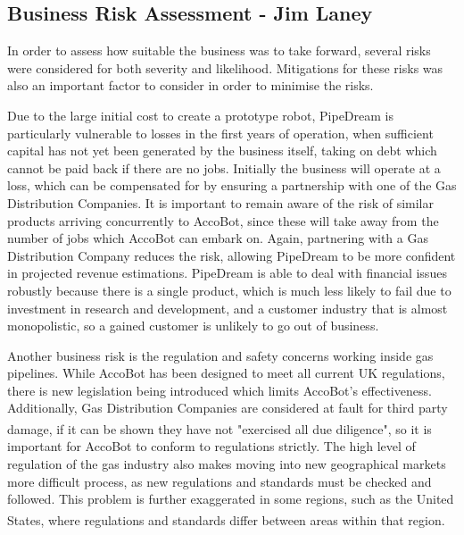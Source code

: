 \documentclass[11pt]{article}		%
\newcommand{\supercite}[1]{\textsuperscript{\cite{#1}}}		%
\begin{document}
		\subsection[Business Risk Assessment]{Business Risk Assessment - Jim Laney}
		     	
		     	In order to assess how suitable the business was to take forward, several risks were considered for both severity and likelihood. 
		     	Mitigations for these risks was also an important factor to consider in order to minimise the risks.
		     	
		     	Due to the large initial cost to create a prototype robot, PipeDream is particularly vulnerable to losses in the first years of operation, when sufficient capital has not yet been generated by the business itself, taking on debt which cannot be paid back if there are no jobs.
		     	Initially the business will operate at a loss, which can be compensated for by ensuring a partnership with one of the Gas Distribution Companies.
		     	It is important to remain aware of the risk of similar products arriving concurrently to AccoBot, since these will take away from the number of jobs which AccoBot can embark on.
		     	Again, partnering with a Gas Distribution Company reduces the risk, allowing PipeDream to be more confident in projected revenue estimations.
		     	PipeDream is able to deal with financial issues robustly because there is a single product, which is much less likely to fail due to investment in research and development, and a customer industry that is almost monopolistic, so a gained customer is unlikely to go out of business.
		     	
		     	Another business risk is the regulation and safety concerns working inside gas pipelines.
		     	While AccoBot has been designed to meet all current UK regulations, there is new legislation being introduced which limits AccoBot's effectiveness.
		     	Additionally, Gas Distribution Companies are considered at fault for third party damage, if it can be shown they have not "exercised all due diligence"\supercite{hse1996guide}, so it is important for AccoBot to conform to regulations strictly.
		     	The high level of regulation of the gas industry also makes moving into new geographical markets more difficult process, as new regulations and standards must be checked and followed.
		     	This problem is further exaggerated in some regions, such as the United States, where regulations and standards differ between areas within that region\supercite{pless2011making}.
		     	
\end{document}
